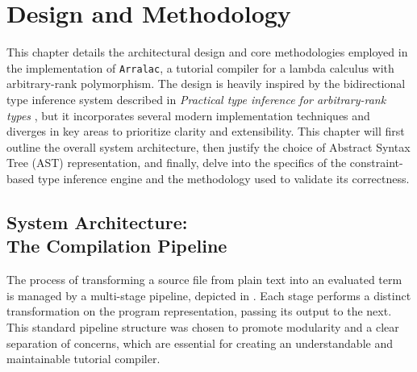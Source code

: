 \chapter{Design and Methodology}
\label{chap:DesignAndMethodology}

This chapter details the architectural design and core methodologies employed in the implementation of \texttt{Arralac}, a tutorial compiler for a lambda calculus with arbitrary-rank polymorphism. The design is heavily inspired by the bidirectional type inference system described in \textit{Practical type inference for arbitrary-rank types} \cite{jones-practical-2007}, but it incorporates several modern implementation techniques and diverges in key areas to prioritize clarity and extensibility. This chapter will first outline the overall system architecture, then justify the choice of Abstract Syntax Tree (AST) representation, and finally, delve into the specifics of the constraint-based type inference engine and the methodology used to validate its correctness.

\section[System Architecture: The Compilation Pipeline]{System Architecture: \\ The Compilation Pipeline}
\label{sec:Design:Pipeline}

The process of transforming a source file from plain text into an evaluated term is managed by a multi-stage pipeline, depicted in . Each stage performs a distinct transformation on the program representation, passing its output to the next. This standard pipeline structure \cite{wits-type-inference-using-constraints} was chosen to promote modularity and a clear separation of concerns, which are essential for creating an understandable and maintainable tutorial compiler.

